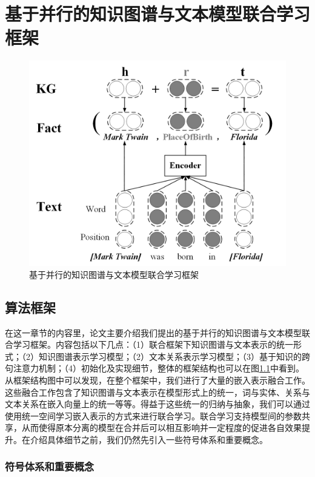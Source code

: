 \chapter{基于并行的知识图谱与文本模型联合学习框架}
\label{cha:jointlearning}


\begin{figure}[]
\centering
\includegraphics[width=0.9\columnwidth]{figures/ch3/joint.jpg}
\caption{基于并行的知识图谱与文本模型联合学习框架}
\label{fig:joinglearning}
\end{figure}

\section{算法框架}
在这一章节的内容里，论文主要介绍我们提出的基于并行的知识图谱与文本模型联合学习框架。内容包括以下几点：（1）联合框架下知识图谱与文本表示的统一形式；（2）知识图谱表示学习模型；（2）文本关系表示学习模型；（3）基于知识的跨句注意力机制；（4）初始化及实现细节，整体的框架结构也可以在图\ref{fig:joinglearning}中看到。从框架结构图中可以发现，在整个框架中，我们进行了大量的嵌入表示融合工作。这些融合工作包含了知识图谱与文本表示在模型形式上的统一，词与实体、关系与文本关系在嵌入向量上的统一等等。得益于这些统一的归纳与抽象，我们可以通过使用统一空间学习嵌入表示的方式来进行联合学习。联合学习支持模型间的参数共享，从而使得原本分离的模型在合并后可以相互影响并一定程度的促进各自效果提升。在介绍具体细节之前，我们仍然先引入一些符号体系和重要概念。

\subsection{符号体系和重要概念}

